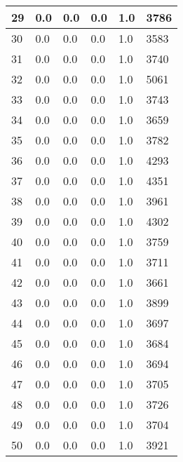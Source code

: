 \begin{longtable}{|l|l|l|l|l|l|}
29 & 0.0 & 0.0 & 0.0 & 1.0 & 3786 \\ \hline 
30 & 0.0 & 0.0 & 0.0 & 1.0 & 3583 \\ \hline 
31 & 0.0 & 0.0 & 0.0 & 1.0 & 3740 \\ \hline 
32 & 0.0 & 0.0 & 0.0 & 1.0 & 5061 \\ \hline 
33 & 0.0 & 0.0 & 0.0 & 1.0 & 3743 \\ \hline 
34 & 0.0 & 0.0 & 0.0 & 1.0 & 3659 \\ \hline 
35 & 0.0 & 0.0 & 0.0 & 1.0 & 3782 \\ \hline 
36 & 0.0 & 0.0 & 0.0 & 1.0 & 4293 \\ \hline 
37 & 0.0 & 0.0 & 0.0 & 1.0 & 4351 \\ \hline 
38 & 0.0 & 0.0 & 0.0 & 1.0 & 3961 \\ \hline 
39 & 0.0 & 0.0 & 0.0 & 1.0 & 4302 \\ \hline 
40 & 0.0 & 0.0 & 0.0 & 1.0 & 3759 \\ \hline 
41 & 0.0 & 0.0 & 0.0 & 1.0 & 3711 \\ \hline 
42 & 0.0 & 0.0 & 0.0 & 1.0 & 3661 \\ \hline 
43 & 0.0 & 0.0 & 0.0 & 1.0 & 3899 \\ \hline 
44 & 0.0 & 0.0 & 0.0 & 1.0 & 3697 \\ \hline 
45 & 0.0 & 0.0 & 0.0 & 1.0 & 3684 \\ \hline 
46 & 0.0 & 0.0 & 0.0 & 1.0 & 3694 \\ \hline 
47 & 0.0 & 0.0 & 0.0 & 1.0 & 3705 \\ \hline 
48 & 0.0 & 0.0 & 0.0 & 1.0 & 3726 \\ \hline 
49 & 0.0 & 0.0 & 0.0 & 1.0 & 3704 \\ \hline 
50 & 0.0 & 0.0 & 0.0 & 1.0 & 3921 \\ \hline 
\end{longtable}